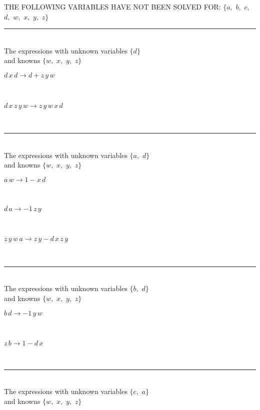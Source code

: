 THE FOLLOWING VARIABLES HAVE NOT BEEN SOLVED FOR:\hfil\break
$\{a,
$ $
b,
$ $
c,
$ $
d,
$ $
w,
$ $
x,
$ $
y,
$ $
z\}$
\smallskip\\
\rule[3pt]{6in}{.7pt}\\
The expressions with unknown variables $\{d\}$\\
and knowns $\{w,
$ $
x,
$ $
y,
$ $
z\}$\smallskip\\
\begin{minipage}{6in}
$
d\,
 x\,
 d\rightarrow d + z\,
 y\,
 w
$
\end{minipage}\medskip \\
\begin{minipage}{6in}
$
d\,
 x\,
 z\,
 y\,
 w\rightarrow z\,
 y\,
 w\,
 x\,
 d
$
\end{minipage}\\
\rule[3pt]{6in}{.7pt}\\
The expressions with unknown variables $\{a,
$ $
d\}$\\
and knowns $\{w,
$ $
x,
$ $
y,
$ $
z\}$\smallskip\\
\begin{minipage}{6in}
$
a\,
 w\rightarrow 1 - x\,
 d
$
\end{minipage}\medskip \\
\begin{minipage}{6in}
$
d\,
 a\rightarrow -1\,
 z\,
 y
$
\end{minipage}\medskip \\
\begin{minipage}{6in}
$
z\,
 y\,
 w\,
 a\rightarrow z\,
 y - d\,
 x\,
 z\,
 y
$
\end{minipage}\\
\rule[3pt]{6in}{.7pt}\\
The expressions with unknown variables $\{b,
$ $
d\}$\\
and knowns $\{w,
$ $
x,
$ $
y,
$ $
z\}$\smallskip\\
\begin{minipage}{6in}
$
b\,
 d\rightarrow -1\,
 y\,
 w
$
\end{minipage}\medskip \\
\begin{minipage}{6in}
$
z\,
 b\rightarrow 1 - d\,
 x
$
\end{minipage}\\
\rule[3pt]{6in}{.7pt}\\
The expressions with unknown variables $\{c,
$ $
a\}$\\
and knowns $\{w,
$ $
x,
$ $
y,
$ $
z\}$\smallskip\\
